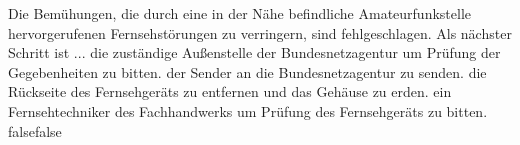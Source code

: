     {Die Bemühungen, die durch eine in der Nähe befindliche Amateurfunkstelle hervorgerufenen Fernsehstörungen zu verringern, sind fehlgeschlagen. Als nächster Schritt ist ...}
    {die zuständige Außenstelle der Bundesnetzagentur um Prüfung der Gegebenheiten zu bitten.}
    {der Sender an die Bundesnetzagentur zu senden.}
    {die Rückseite des Fernsehgeräts zu entfernen und das Gehäuse zu erden.}
    {ein Fernsehtechniker des Fachhandwerks um Prüfung des Fernsehgeräts zu bitten.}
    {false}{false}